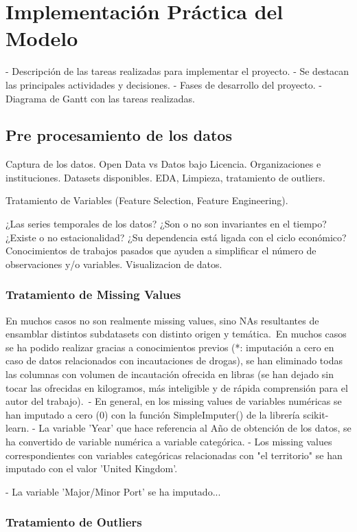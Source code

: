 \documentclass{article}
\begin{document}
\section{Implementación Práctica del Modelo}
 - Descripción de las tareas realizadas para implementar el proyecto.
 - Se destacan las principales actividades y decisiones.
 - Fases de desarrollo del proyecto.
 - Diagrama de Gantt con las tareas realizadas.
\subsection{Pre procesamiento de los datos}
Captura de los datos. Open Data vs Datos bajo Licencia. Organizaciones e instituciones. Datasets disponibles.
EDA, Limpieza, tratamiento de outliers.

Tratamiento de Variables (Feature Selection, Feature Engineering).

¿Las series temporales de los datos? ¿Son o no son invariantes en el tiempo?¿Existe o no estacionalidad? ¿Su dependencia está ligada con el ciclo económico?
Conocimientos de trabajos pasados que ayuden a simplificar el número de observaciones y/o variables.
Visualizacion de datos.

\subsubsection{Tratamiento de Missing Values}
En muchos casos no son realmente missing values, sino NAs resultantes de ensamblar distintos subdatasets con distinto origen y temática.\
En muchos casos se ha podido realizar gracias a conocimientos previos (*: imputación a cero en caso de datos relacionados con incautaciones de drogas),
se han eliminado todas las columnas con volumen de incautación ofrecida en libras (se han dejado sin tocar las ofrecidas en kilogramos, más inteligible y de rápida comprensión para el autor del trabajo).\
- En general, en los missing values de variables numéricas se han imputado a cero (0) con la función SimpleImputer() de la librería scikit-learn.
- La variable 'Year' que hace referencia al Año de obtención de los datos, se ha convertido de variable numérica a variable categórica.
- Los missing values correspondientes con variables categóricas relacionadas con "el territorio" se han imputado con el valor 'United Kingdom'.

- La variable 'Major/Minor Port' se ha imputado...



\subsubsection{Tratamiento de Outliers}
\end{document}
